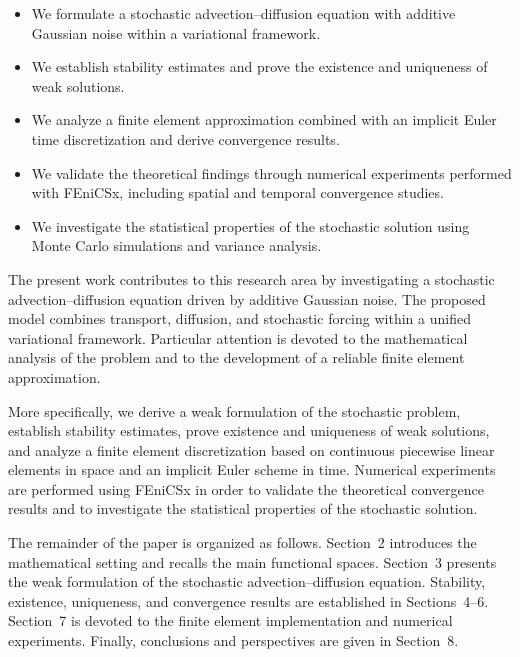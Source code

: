 \begin{itemize}
\item We formulate a stochastic advection--diffusion equation with additive Gaussian noise within a variational framework.
\item We establish stability estimates and prove the existence and uniqueness of weak solutions.
\item We analyze a finite element approximation combined with an implicit Euler time discretization and derive convergence results.
\item We validate the theoretical findings through numerical experiments performed with FEniCSx, including spatial and temporal convergence studies.
\item We investigate the statistical properties of the stochastic solution using Monte Carlo simulations and variance analysis.
\end{itemize}

The present work contributes to this research area by investigating a stochastic advection--diffusion 
equation driven by additive Gaussian noise. The proposed model combines transport, diffusion, and 
stochastic forcing within a unified variational framework. Particular attention is devoted to the 
mathematical analysis of the problem and to the development of a reliable finite element approximation.

More specifically, we derive a weak formulation of the stochastic problem, establish stability estimates, 
prove existence and uniqueness of weak solutions, and analyze a finite element discretization based on 
continuous piecewise linear elements in space and an implicit Euler scheme in time. Numerical experiments 
are performed using FEniCSx in order to validate the theoretical convergence results and to investigate 
the statistical properties of the stochastic solution.

The remainder of the paper is organized as follows. Section~2 introduces the mathematical setting and recalls 
the main functional spaces. Section~3 presents the weak formulation of the stochastic advection--diffusion 
equation. Stability, existence, uniqueness, and convergence results are established in Sections~4--6. 
Section~7 is devoted to the finite element implementation and numerical experiments. Finally, conclusions 
and perspectives are given in Section~8.

